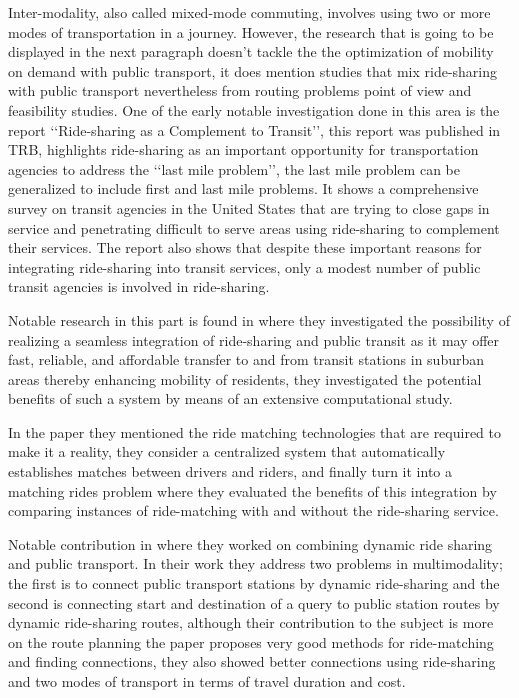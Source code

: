 \documentclass{article}
\begin{document}
Inter-modality, also called mixed-mode commuting, involves using two or more modes of transportation in a journey. However, the research that is going to be displayed in the next paragraph doesn\rq{t} tackle the the optimization of mobility on demand with public transport, it does mention studies that mix ride-sharing with public transport nevertheless from routing problems point of view and feasibility studies.  
One of the early notable investigation done in this area is the report \lq\lq{Ride-sharing as a Complement to Transit}\rq\rq \cite{Murray14655}, this report was published in TRB, highlights ride-sharing as an important opportunity for transportation
agencies to address the \lq\lq{last mile problem}\rq\rq, the last mile problem can be generalized to include first and last mile problems. It shows a comprehensive survey on transit agencies in the United States that are trying to close gaps in service and penetrating difficult to serve areas using ride-sharing to complement their services. The report also shows that despite these important reasons for integrating ride-sharing into transit services, only a modest number of public transit agencies is involved in ride-sharing. 

Notable research in this part is found in \citep{STIGLIC201812} where they investigated the possibility of realizing a seamless integration of ride-sharing and public transit as it may offer fast, reliable, and affordable transfer to and from transit stations in suburban areas thereby enhancing mobility of residents, they investigated the potential benefits of such a system by means of an extensive computational study.

In the paper they mentioned the ride matching technologies that are required to make it a reality, they consider a centralized system that automatically establishes matches between drivers and riders, and finally turn it into a matching rides problem where they evaluated the benefits of this integration by comparing instances of ride-matching with and without the ride-sharing service. 

Notable contribution in \cite{FAHNENSCHREIBER2016176} where they worked on combining dynamic ride sharing and public transport. In their work they address two problems in multimodality; the first is to connect public transport stations by dynamic ride-sharing and the second is connecting start and destination of a query to public station routes by dynamic ride-sharing routes, although their contribution to the subject is more on the route planning the paper proposes very good methods for ride-matching and finding connections, they also showed better connections using ride-sharing and two modes of transport in terms of travel duration and cost.%
\end{document}
